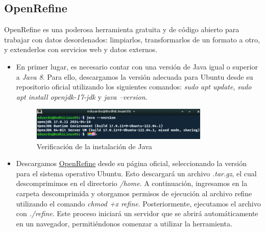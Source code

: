 \documentclass[12pt]{article}
\begin{document}
            \subsection{OpenRefine}
                OpenRefine es una poderosa herramienta gratuita y de código abierto para trabajar con datos desordenados: limpiarlos, transformarlos de un formato a otro, y extenderlos con servicios web y datos externos.
                
                \begin{itemize}
                    \item En primer lugar, es necesario contar con una versión de Java igual o superior a \textit{Java 8}. Para ello, descargamos la versión adecuada para Ubuntu desde su repositorio oficial utilizando los siguientes comandos: \textit{sudo apt update}, \textit{sudo apt install openjdk-17-jdk} y \textit{java --version}.
                        \begin{figure}[!h]
                            \centering
                            \includegraphics[width=0.8\textwidth]{img/openrefine-1.png}
                            \caption{Verificación de la instalación de Java}
                        \end{figure}
            
                    \item Descargamos \href{https://openrefine.org/download}{\uline{OpenRefine}} desde su página oficial, seleccionando la versión para el sistema operativo Ubuntu. Esto descargará un archivo \textit{.tar.gz}, el cual descomprimimos en el directorio \textit{/home}. A continuación, ingresamos en la carpeta descomprimida y otorgamos permisos de ejecución al archivo refine utilizando el comando \textit{chmod +x refine}. Posteriormente, ejecutamos el archivo con \textit{./refine}. Este proceso iniciará un servidor que se abrirá automáticamente en un navegador, permitiéndonos comenzar a utilizar la herramienta.
                        \newpage
                        \begin{figure}[!h]
                            \centering
                            \begin{subfigure}[b]{0.7\textwidth}
                      

\end{subfigure}
\end{figure}
\end{itemize}
\end{document}

